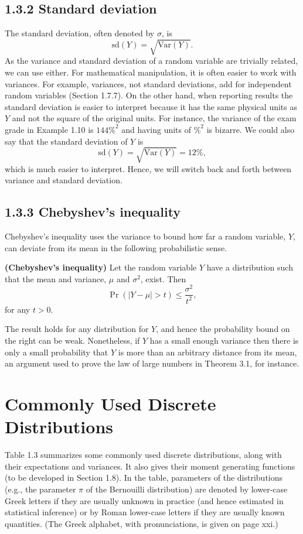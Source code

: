 \subsection{1.3.2 Standard deviation}
The standard deviation, often denoted by $\sigma$, is 
\[
\text{sd}(Y) = \sqrt{\text{Var}(Y)}.
\]
As the variance and standard deviation of a random variable are trivially related, we can use either. For mathematical manipulation, it is often easier to work with variances. For example, variances, not standard deviations, add for independent random variables (Section 1.7.7). On the other hand, when reporting results the standard deviation is easier to interpret because it has the same physical units as $Y$ and not the square of the original units. For instance, the variance of the exam grade in Example 1.10 is $144\%^2$ and having units of $\%^2$ is bizarre. We could also say that the standard deviation of $Y$ is
\[
\text{sd}(Y) = \sqrt{\text{Var}(Y)} = 12\%,
\]
which is much easier to interpret. Hence, we will switch back and forth between variance and standard deviation.

\subsection{1.3.3 Chebyshev’s inequality}
Chebyshev’s inequality uses the variance to bound how far a random variable, $Y$, can deviate from its mean in the following probabilistic sense.

\begin{theorem}
\textbf{(Chebyshev’s inequality)} Let the random variable $Y$ have a distribution such that the mean and variance, $\mu$ and $\sigma^2$, exist. Then
\[
\Pr(|Y - \mu| > t) \leq \frac{\sigma^2}{t^2},
\]
for any $t > 0$. 
\end{theorem}
The result holds for any distribution for $Y$, and hence the probability bound on the right can be weak. Nonetheless, if $Y$ has a small enough variance then there is only a small probability that $Y$ is more than an arbitrary distance from its mean, an argument used to prove the law of large numbers in Theorem 3.1, for instance.

\section{Commonly Used Discrete Distributions}
Table 1.3 summarizes some commonly used discrete distributions, along with their expectations and variances. It also gives their moment generating functions (to be developed in Section 1.8). In the table, parameters of the distributions (e.g., the parameter $\pi$ of the Bernouilli distribution) are denoted by lower-case Greek letters if they are usually unknown in practice (and hence estimated in statistical inference) or by Roman lower-case letters if they are usually known quantities. (The Greek alphabet, with pronunciations, is given on page xxi.)

